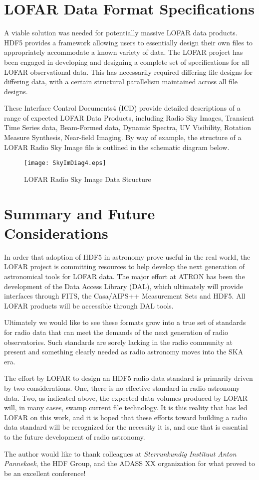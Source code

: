 \documentclass[11pt,twoside]{article}
\begin{document}
\section{LOFAR Data Format Specifications}
A viable solution was needed for potentially massive LOFAR data products.
HDF5 provides a framework allowing users to essentially design their own files to
appropriately accommodate a known variety of data. The LOFAR project has been engaged in
developing and designing a complete set of specifications for all LOFAR observational data.
This has necessarily required differing file designs for differing data, with a certain
structural parallelism maintained across all file designs.

These Interface Control Documents4 (ICD) provide detailed descriptions of a range of expected LOFAR Data Products, including
Radio Sky Images, Transient Time Series data, Beam-Formed data, Dynamic Spectra, UV Visibility, Rotation Measure Synthesis, 
Near-field Imaging.  By way of example, the structure of a LOFAR Radio Sky Image file is outlined in the schematic diagram below.
\begin{figure}[htbp]
  \centering
  \texttt{[image: SkyImDiag4.eps]}
  \caption{LOFAR Radio Sky Image Data Structure}
  \label{fig:skyimDiag}
\end{figure}
\section{Summary and Future Considerations}
In order that adoption of HDF5 in astronomy prove useful in the real world,
the LOFAR project is committing resources to help develop the next generation of
astronomical tools for LOFAR data. The major effort at ATRON has been the development
of the Data Access Library (DAL), which ultimately will provide interfaces through FITS,
the Casa/AIPS++ Measurement Sets and HDF5. All LOFAR products will be accessible through DAL tools.

Ultimately we would like to see these formats grow into a true set of standards
for radio data that can meet the demands of the next generation of radio observatories.
Such standards are sorely lacking in the radio community at present and
something clearly needed as radio astronomy moves into the SKA era.

The effort by LOFAR to design an HDF5 radio data standard is primarily driven by two considerations.
One, there is no effective standard in radio astronomy data. Two, as indicated above, the expected
data volumes produced by LOFAR will, in many cases, swamp current file technology.  It is this reality
that has led LOFAR on this work, and it is hoped that these efforts toward building a radio data standard
will be recognized for the necessity it is, and one that is essential to the future development of radio astronomy.

\acknowledgements The author would like to thank colleagues at \textit{Sterrunkundig Instituut Anton Pannekoek},
the HDF Group, and the ADASS XX organization for what proved to be an excellent conference!

%
\end{document}
